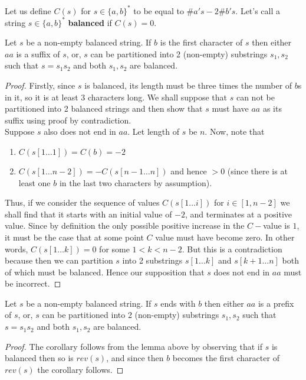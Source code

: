 
\begin{soln}
\begin{notn}
Let us define $C(s)$ for $s \in \{a, b\}^*$ to be equal to $\# a's - 2 \# b's$.
Let's call a string $s \in \{a, b\}^*$ \textbf{balanced} if $C(s) = 0$.
\end{notn}
\begin{lemma}
Let $s$ be a non-empty balanced string. If $b$ is the first character of $s$ then either $aa$ is a suffix of $s$, or,
$s$ can be partitioned into 2 (non-empty) substrings $s_1, s_2$ such that $s = s_1 s_2$ and
both $s_1, s_2$ are balanced.
\end{lemma}
\begin{proof}
Firstly, since $s$ is balanced, its length must be three times the number of $b$s in it, so it is at least 3 characters long.
We shall suppose that $s$ can not be partitioned into 2 balanced strings and then show that $s$
must have $aa$ as its suffix using proof by contradiction.\\

Suppose $s$ also does not end in $aa$. Let length of $s$ be $n$.
Now, note that
\begin{enumerate}
    \item $C(s[1 \ldots 1]) = C(b) = -2$
    \item $C(s[1 \ldots n-2]) = - C(s[n-1 \ldots n])$ and hence $> 0$ (since there is at least one $b$ in the last two characters by assumption).
\end{enumerate}
Thus, if we consider the sequence of values $C(s[1 \ldots i])$ for $i \in [1, n-2]$
we shall find that it starts with an initial value of $-2$, and terminates at a positive
value. Since by definition the only possible positive increase in the $C-$value is $1$, it must be the case that
at some point $C$ value must have become zero. In other words, $C(s[1 \ldots k]) = 0$ for
some $1 < k < n-2$. But this is a contradiction because then we can partition $s$ into 2
substrings $s[1 \ldots k]$ and $s[k+1 \ldots n]$ both of which must be balanced. Hence
our supposition that $s$ does not end in $aa$ must be incorrect.
\end{proof}

\begin{cor}
Let $s$ be a non-empty balanced string. If $s$ ends with $b$ then either $aa$ is a prefix of $s$, or,
$s$ can be partitioned into 2 (non-empty) substrings $s_1, s_2$ such that $s = s_1 s_2$ and
both $s_1, s_2$ are balanced.
\end{cor}
\begin{proof}
The corollary follows from the lemma above by observing that if $s$ is balanced then so is $rev(s)$,
and since then $b$ becomes the first character of $rev(s)$ the corollary follows.
\end{proof}


\end{soln}
